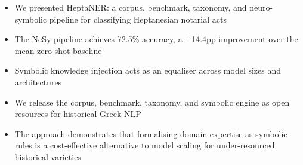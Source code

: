 \documentclass[10pt, a4paper]{article}
\begin{document}
\begin{itemize}
\item We presented HeptaNER: a corpus, benchmark, taxonomy, and neuro-symbolic pipeline for classifying Heptanesian notarial acts
\item The NeSy pipeline achieves 72.5\% accuracy, a +14.4pp improvement over the mean zero-shot baseline
\item Symbolic knowledge injection acts as an equaliser across model sizes and architectures
\item We release the corpus, benchmark, taxonomy, and symbolic engine as open resources for historical Greek NLP
\item The approach demonstrates that formalising domain expertise as symbolic rules is a cost-effective alternative to model scaling for under-resourced historical varieties
\end{itemize}






%
%
\end{document}

